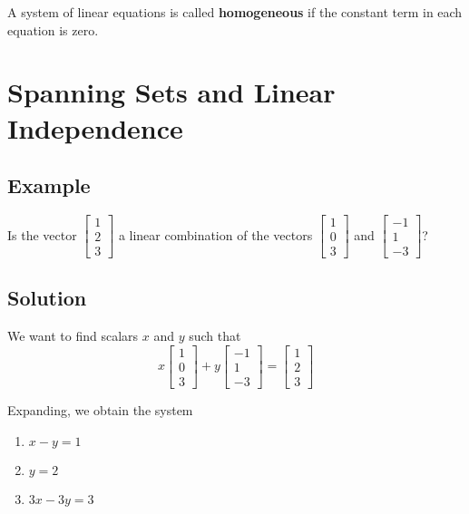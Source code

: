 A system of linear equations is called \textbf{homogeneous} if the
constant term in each equation is zero.

\section{Spanning Sets and Linear Independence}

\subsection*{Example}
Is the vector $\begin{bmatrix}
        1 \\ 2 \\ 3
    \end{bmatrix}$ a linear combination of the vectors $\begin{bmatrix}
        1 \\ 0 \\ 3
    \end{bmatrix}$ and $\begin{bmatrix}
        -1 \\ 1 \\ -3
    \end{bmatrix}$?

\subsection*{Solution}
We want to find scalars $x$ and $y$ such that
$$x\begin{bmatrix}
        1 \\ 0 \\ 3
    \end{bmatrix}+y\begin{bmatrix}
        -1 \\ 1 \\ -3
    \end{bmatrix}=\begin{bmatrix}
        1 \\ 2 \\ 3
    \end{bmatrix}$$

Expanding, we obtain the system
\begin{enumerate}
    \item[] $x-y=1$
    \item[] $y=2$
    \item[] $3x-3y=3$
\end{enumerate}

